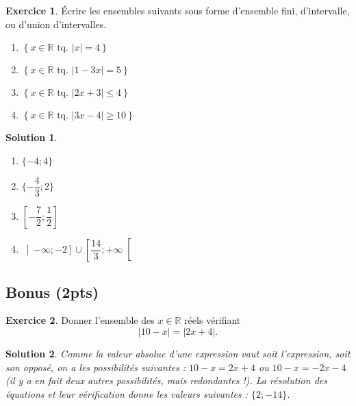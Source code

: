 \documentclass[a4paper, 14pt]{extarticle}
\theoremstyle{plain}
\newtheorem*{sol}{Solution}
\theoremstyle{definition}
\newtheorem{ex}{Exercice}
\newcommand{\R}{\mathbb{R}}
\newcommand{\xRtq}[1]{
	$\left\{ x \in \R \text{ tq. } #1 \right\}$
}
\newcommand{\vabs}[1]{
	\left| #1 \right|
}
\newcommand{\exe}[2]{
		\begin{ex} #1  \end{ex}
		\begin{sol} #2 \end{sol}
	}
\newcommand{\exe}[2]{
		\begin{ex} #1  \end{ex}
	}
\begin{document}
\exe{
	Écrire les ensembles suivants sous forme d'ensemble fini, d'intervalle, ou d'union d'intervalles.
	\begin{multicols}{2}
	\begin{enumerate}
		\item \xRtq{\vabs{x} = 4}
		\item \xRtq{\vabs{1-3x} = 5}
		\item \xRtq{\vabs{2x + 3} \leq 4}
		\item \xRtq{\vabs{3x-4} \geq 10}
	\end{enumerate}
	\end{multicols}
}
{

	\begin{multicols}{2}
	\begin{enumerate}
		\item $\{ -4 ; 4\}$
		\item $ \{ -\dfrac43 ; 2 \}$
		\item $\left[ -\dfrac72 ; \dfrac12\right]$
		\item $\left]-\infty ; -2\right] \cup \left[ \dfrac{14}3 ; +\infty \right[$
	\end{enumerate}
	\end{multicols}

}

\subsection*{Bonus (2pts)}

\exe{
	Donner l'ensemble des $x\in\R$ réels vérifiant
		\[ |10 - x| = |2x + 4|. \]
}
{
	Comme la valeur absolue d'une expression vaut soit l'expression, soit son opposé, on a les possibilités suivantes : $10-x = 2x+4$ ou $10-x = -2x-4$ (il y a en fait deux autres possibilités, mais redondantes !).
	La résolution des équations et leur vérification donne les valeurs suivantes :
	$\{ 2 ; -14 \}$.
}
\end{document}
